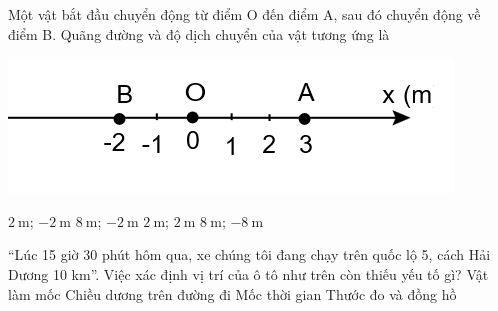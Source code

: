 \begin{ex}
	Một vật bắt đầu chuyển động từ điểm O đến điểm A, sau đó chuyển động về điểm B. Quãng đường và độ dịch chuyển của vật tương ứng là	
	\begin{center}
		\includegraphics[width=0.4\linewidth]{figs/VN10-2022-PH-TP004-P-2}
	\end{center}
	\choice
	{$\SI{2}{\meter}$; $\SI{-2}{\meter}$}
	{\True $\SI{8}{\meter}$; $\SI{-2}{\meter}$}
	{$\SI{2}{\meter}$; $\SI{2}{\meter}$}
	{$\SI{8}{\meter}$; $\SI{-8}{\meter}$}
	\loigiai{}
\end{ex}
\begin{ex}
	“Lúc 15 giờ 30 phút hôm qua, xe chúng tôi đang chạy trên quốc lộ 5, cách Hải Dương 10 km”. Việc xác định vị trí của ô tô như trên còn thiếu yếu tố gì?	
	\choice
	{Vật làm mốc}
	{\True Chiều dương trên đường đi}
	{Mốc thời gian}
	{Thước đo và đồng hồ}
	\loigiai{}
\end{ex}

